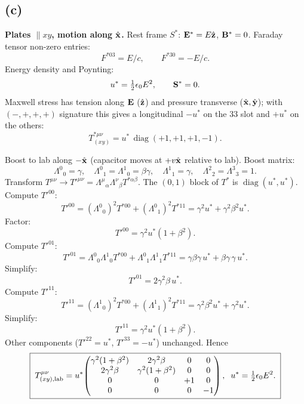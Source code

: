 \documentclass[11pt]{article}
\DeclareMathOperator{\diag}{diag}
\begin{document}
\subsection*{(c)}

\textbf{Plates $\parallel xy$, motion along $\hat{\vb x}$.} Rest frame $S^*$: $\vb E^*=E\hat{\vb z}$, $\vb B^*=0$. Faraday tensor non-zero entries:
\[ F^{*03}=E/c,\qquad F^{*30}=-E/c. \]
Energy density and Poynting:
\[ u^*=\tfrac12\epsilon_0 E^2,\qquad \vb S^*=0. \]
Maxwell stress has tension along $\vb E$ ($\hat{\vb z}$) and pressure transverse ($\hat{\vb x},\hat{\vb y}$); with $(-,+,+,+)$ signature this gives a longitudinal $-u^*$ on the $33$ slot and $+u^*$ on the others:
\[ T^{*\mu\nu}_{(xy)} = u^*\,\diag(+1,+1,+1,-1). \]

Boost to lab along $-\hat{\vb x}$ (capacitor moves at $+v\hat{\vb x}$ relative to lab). Boost matrix:
\[ \Lambda^0{}_0=\gamma,\quad \Lambda^0{}_1=\Lambda^1{}_0=\beta\gamma,\quad \Lambda^1{}_1=\gamma,\quad \Lambda^2{}_2=\Lambda^3{}_3=1. \]
Transform $T^{\mu\nu}\to T'^{\mu\nu} = \Lambda^\mu{}_\alpha\Lambda^\nu{}_\beta T^{*\alpha\beta}$. The $(0,1)$ block of $T^*$ is $\diag(u^*,u^*)$. Compute $T'^{00}$:
\[ T'^{00} = (\Lambda^0{}_0)^2 T^{*00} + (\Lambda^0{}_1)^2 T^{*11} = \gamma^2 u^* + \gamma^2\beta^2 u^*. \]
Factor:
\[ T'^{00} = \gamma^2 u^*(1+\beta^2). \]
Compute $T'^{01}$:
\[ T'^{01} = \Lambda^0{}_0\Lambda^1{}_0 T^{*00} + \Lambda^0{}_1\Lambda^1{}_1 T^{*11} = \gamma\beta\gamma\,u^* + \beta\gamma\,\gamma\,u^*. \]
Simplify:
\[ T'^{01} = 2\gamma^2\beta\, u^*. \]
Compute $T'^{11}$:
\[ T'^{11} = (\Lambda^1{}_0)^2 T^{*00} + (\Lambda^1{}_1)^2 T^{*11} = \gamma^2\beta^2 u^* + \gamma^2 u^*. \]
Simplify:
\[ T'^{11} = \gamma^2 u^*(1+\beta^2). \]
Other components ($T'^{22} = u^*$, $T'^{33} = -u^*$) unchanged. Hence
\begin{equation}
\boxed{\;T^{\mu\nu}_{(xy),\rm lab} = u^*\!\begin{pmatrix}\gamma^2(1+\beta^2)&2\gamma^2\beta&0&0\\ 2\gamma^2\beta&\gamma^2(1+\beta^2)&0&0\\ 0&0&+1&0\\ 0&0&0&-1\end{pmatrix},\;\;u^*=\tfrac12\epsilon_0 E^2.\;}
\end{equation}
\end{document}
